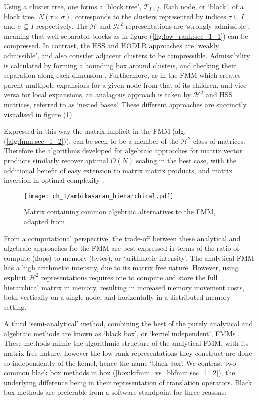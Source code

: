 Using a cluster tree, one forms a `block tree', $\mathcal{T}_{I \times I}$. Each node, or `block', of a block tree, $N(\tau \times \sigma)$, corresponds to the clusters represented by indices $\tau \subseteq I$ and $\sigma \subseteq I$ respectively. The $\mathcal{H}$ and $\mathcal{H}^2$ representations are `strongly admissible', meaning that well separated blocks as in figure (\ref{fig:low_rank:sec_1_1}) can be compressed. In contrast, the HSS and HODLR approaches are `weakly admissible', and also consider adjacent clusters to be compressible. Admissibility is calculated by forming a bounding box around clusters, and checking their separation along each dimension \cite{borm2003introduction}. Furthermore, as in the FMM which creates parent multipole expansions for a given node from that of its children, and vice versa for local expansions, an analagous approach is taken by $\mathcal{H}^2$ and HSS matrices, referred to as `nested bases'. These different approaches are succinctly visualised in figure (\ref{fig:ambikasaran_hierarchical:sec_1_2}). 

Expressed in this way the matrix implicit in the FMM (alg. (\ref{alg:fmm:sec_1_2})), can be seen to be a member of the $\mathcal{H}^2$ class of matrices. Therefore the algorithms developed for algebraic approaches for matrix vector products similarly recover optimal $O(N)$ scaling in the best case, with the additional benefit of easy extension to matrix matrix products, and matrix inversion in optimal complexity \cite{borm2003introduction}.

\begin{figure}
    \centering
    \texttt{[image: ch\_1/ambikasaran\_hierarchical.pdf]}
    \caption{Matrix containing common algebraic alternatives to the FMM, adapted from \cite{ambikasaran2013fast}.}
    \label{fig:ambikasaran_hierarchical:sec_1_2}
\end{figure}

From a computational perspective, the trade-off between these analytical and algebraic approaches for the FMM are best expressed in terms of the ratio of compute (flops) to memory (bytes), or `arithmetic intensity'. The analytical FMM has a high arithmetic intensity, due to its matrix free nature. However, using explicit $\mathcal{H}^2$ representations requires one to compute and store the full hierarchical matrix in memory, resulting in increased memory movement costs, both vertically on a single node, and horizontally in a distributed memory setting. 

A third `semi-analytical' method, combining the best of the purely analytical and algebraic methods are known as `black box', or `kernel independent', FMMs \cite{Ying:2004:JCP,fong2009black,martinsson2007accelerated}. These methods mimic the algorithmic structure of the analytical FMM, with its matrix free nature, however the low rank representations they construct are done so independently of the kernel, hence the name `black box'. We contrast two common black box methods in box (\ref{box:kifmm_vs_bbfmm:sec_1_2}), the underlying difference being in their representation of translation operators. Black box methods are preferable from a software standpoint for three reasons:

